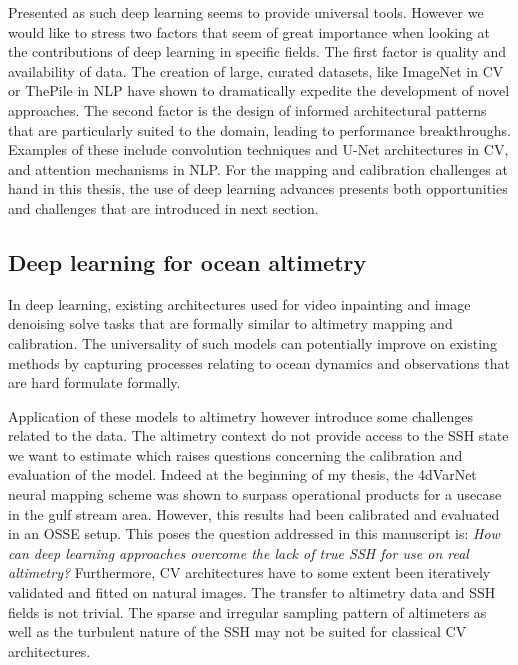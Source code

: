 \begin{bibunit}
Presented as such deep learning seems to provide universal tools.
However we would like to stress two factors that seem of great importance when looking at the contributions of deep learning in specific fields.
The first factor is quality and availability of data.
The creation of large, curated datasets, like ImageNet\cite{dengImageNetLargescaleHierarchical2009} in CV or ThePile\cite{gaoPile800GBDataset2020} in NLP have shown to dramatically expedite the development of novel approaches. 
The second factor is the design of informed architectural patterns that are particularly suited to the domain, leading to performance breakthroughs.
Examples of these include convolution techniques\cite{lecunHandwrittenDigitRecognition1989} and U-Net architectures\cite{ronnebergerUNetConvolutionalNetworks2015} in CV, and attention mechanisms\cite{vaswaniAttentionAllYou} in NLP. 
For the mapping and calibration challenges at hand in this thesis, the use of deep learning advances presents both opportunities and challenges that are introduced in next section.

\subsection*{Deep learning for ocean altimetry}

In deep learning, existing architectures used for video inpainting\cite{kimDeepVideoInpainting} and image denoising\cite{tianDeepLearningImage2020} solve tasks that are formally similar to altimetry mapping and calibration.
The universality of such models can potentially improve on existing methods by capturing processes relating to ocean dynamics and observations that are hard formulate formally.

Application of these models to altimetry however introduce some challenges related to the data.
The altimetry context do not provide access to the SSH state we want to estimate which raises questions concerning the calibration and evaluation of the model.
Indeed at the beginning of my thesis, the 4dVarNet neural mapping scheme was shown to surpass operational products for a usecase in the gulf stream area\cite{fabletENDTOENDPHYSICSINFORMEDREPRESENTATION2021}. However, this results had been calibrated and evaluated in an OSSE setup. 
This poses the question addressed in this manuscript is: \textit{How can deep learning approaches overcome the lack of true SSH for use on real altimetry?}
Furthermore, CV architectures have to some extent been iteratively validated and fitted on natural images.
The transfer to altimetry data and SSH fields is not trivial.
The sparse and irregular sampling pattern of altimeters  as well as the turbulent nature of the SSH may not be suited for classical CV architectures.


\end{bibunit}
